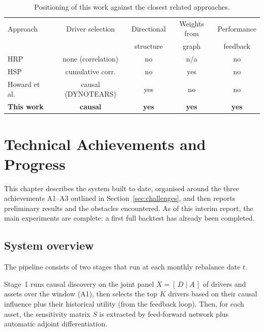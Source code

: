 \documentclass[12pt, a4paper]{report}
\begin{document}
\begin{table}[t]
  \centering
  \caption{Positioning of this work against the closest related approaches.}
  \label{tab:gap}
  \begin{tabular}{l c c c c}
    \toprule
    Approach & Driver selection & Directional & Weights from & Performance \\
             &                  & structure   & graph        & feedback \\
    \midrule
    HRP \cite{lopezdeprado2016hrp}        & none (correlation) & no  & n/a & no \\
    HSP \cite{rodriguez2023hsp}           & cumulative corr.   & no  & yes & no \\
    Howard et al.\ \cite{howard2025causal} & causal (DYNOTEARS) & yes & no  & no \\
    \textbf{This work}                    & \textbf{causal}    & \textbf{yes} & \textbf{yes} & \textbf{yes} \\
    \bottomrule
  \end{tabular}
\end{table}

\chapter{Technical Achievements and Progress}
\label{chap:progress}

This chapter describes the system built to date, organised around the three achievements A1--A3
outlined in Section~\ref{sec:challenges}, and then reports preliminary results and the obstacles
encountered. 
As of this interim report, the main experiments are complete: a first full backtest has already been completed.

\section{System overview}
\label{sec:overview}

The pipeline consists of two stages that run at each monthly rebalance date $t$.

Stage~1 runs causal discovery on the joint panel $X = [\,D \mid A\,]$ of drivers and assets
over the window (A1), then selects the top $K$ drivers based on their causal influence plus their
historical utility (from the feedback loop). Then, for each asset, the sensitivity matrix $S$ is extracted by feed-forward network plus
automatic adjoint differentiation.
\end{document}
